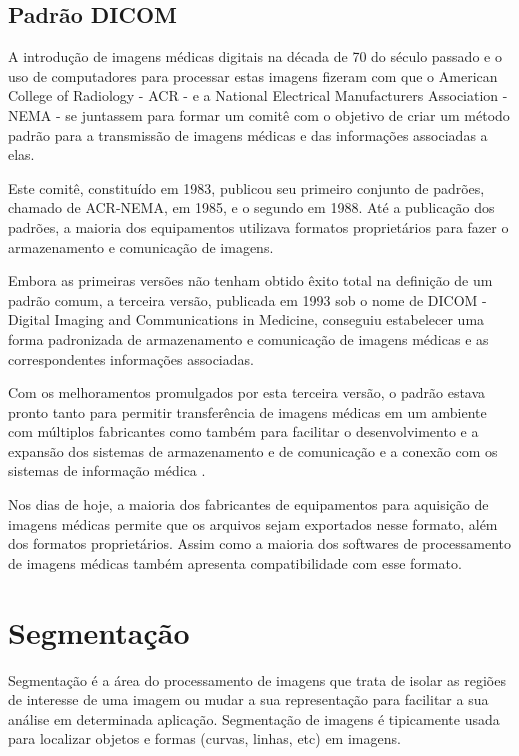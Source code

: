 \subsection{Padrão DICOM}

A introdução de imagens médicas digitais na década de 70 do século passado e o uso de computadores para processar estas imagens fizeram com que o American College of Radiology - ACR - e a National Electrical Manufacturers Association - NEMA - se juntassem para formar um comitê com o objetivo de criar um método padrão para a transmissão de imagens médicas e das informações associadas a elas.

Este comitê, constituído em 1983, publicou seu primeiro conjunto de padrões, chamado de ACR-NEMA, em 1985, e o segundo em 1988. Até a publicação dos padrões, a maioria dos equipamentos utilizava formatos proprietários para fazer o armazenamento e comunicação de imagens.

Embora as primeiras versões não tenham obtido êxito total na definição de um padrão comum, a terceira versão, publicada em 1993 sob o nome de DICOM - Digital Imaging and Communications in Medicine, conseguiu estabelecer uma forma padronizada de armazenamento e comunicação de imagens médicas e as correspondentes informações associadas.

Com os melhoramentos promulgados por esta terceira versão, o padrão estava pronto tanto para permitir transferência de imagens médicas em um ambiente com múltiplos fabricantes como também para facilitar o desenvolvimento e a expansão dos sistemas de armazenamento e de comunicação e a conexão com os sistemas de informação médica \cite{nema}.

Nos dias de hoje, a maioria dos fabricantes de equipamentos para aquisição de imagens médicas permite que os arquivos sejam exportados nesse formato, além dos formatos proprietários. Assim como a maioria dos softwares de processamento de imagens médicas também apresenta compatibilidade com esse formato.

\section{Segmentação}

Segmentação é a área do processamento de imagens que trata de isolar as regiões de interesse de uma imagem ou mudar a sua representação para facilitar a sua análise em determinada aplicação. Segmentação de imagens é tipicamente usada para localizar objetos e formas (curvas, linhas, etc) em imagens.

